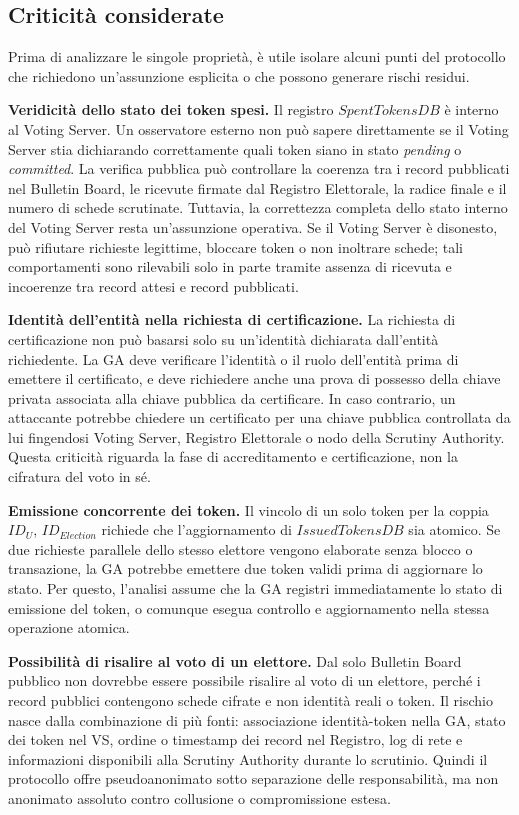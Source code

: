 \documentclass[a4paper,12pt]{article}
\begin{document}
\subsection{Criticità considerate}

Prima di analizzare le singole proprietà, è utile isolare alcuni punti del protocollo che richiedono un'assunzione esplicita o che possono generare rischi residui.

\textbf{Veridicità dello stato dei token spesi.}
Il registro \(SpentTokensDB\) è interno al Voting Server. Un osservatore esterno non può sapere direttamente se il Voting Server stia dichiarando correttamente quali token siano in stato \emph{pending} o \emph{committed}. La verifica pubblica può controllare la coerenza tra i record pubblicati nel Bulletin Board, le ricevute firmate dal Registro Elettorale, la radice finale e il numero di schede scrutinate. Tuttavia, la correttezza completa dello stato interno del Voting Server resta un'assunzione operativa. Se il Voting Server è disonesto, può rifiutare richieste legittime, bloccare token o non inoltrare schede; tali comportamenti sono rilevabili solo in parte tramite assenza di ricevuta e incoerenze tra record attesi e record pubblicati.

\textbf{Identità dell'entità nella richiesta di certificazione.}
La richiesta di certificazione non può basarsi solo su un'identità dichiarata dall'entità richiedente. La GA deve verificare l'identità o il ruolo dell'entità prima di emettere il certificato, e deve richiedere anche una prova di possesso della chiave privata associata alla chiave pubblica da certificare. In caso contrario, un attaccante potrebbe chiedere un certificato per una chiave pubblica controllata da lui fingendosi Voting Server, Registro Elettorale o nodo della Scrutiny Authority. Questa criticità riguarda la fase di accreditamento e certificazione, non la cifratura del voto in sé.

\textbf{Emissione concorrente dei token.}
Il vincolo di un solo token per la coppia \(ID_U\), \(ID_{Election}\) richiede che l'aggiornamento di \(IssuedTokensDB\) sia atomico. Se due richieste parallele dello stesso elettore vengono elaborate senza blocco o transazione, la GA potrebbe emettere due token validi prima di aggiornare lo stato. Per questo, l'analisi assume che la GA registri immediatamente lo stato di emissione del token, o comunque esegua controllo e aggiornamento nella stessa operazione atomica.

\textbf{Possibilità di risalire al voto di un elettore.}
Dal solo Bulletin Board pubblico non dovrebbe essere possibile risalire al voto di un elettore, perché i record pubblici contengono schede cifrate e non identità reali o token. Il rischio nasce dalla combinazione di più fonti: associazione identità-token nella GA, stato dei token nel VS, ordine o timestamp dei record nel Registro, log di rete e informazioni disponibili alla Scrutiny Authority durante lo scrutinio. Quindi il protocollo offre pseudoanonimato sotto separazione delle responsabilità, ma non anonimato assoluto contro collusione o compromissione estesa.
\end{document}
